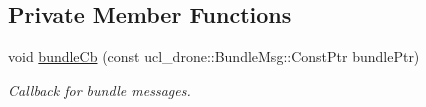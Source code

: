 \subsection*{Private Member Functions}
\begin{DoxyCompactItemize}
\item 
\mbox{\label{classBundleAdjuster_ac252cd426bfdad4e3089d885a2ab6ac2}} 
void \hyperlink{classBundleAdjuster_ac252cd426bfdad4e3089d885a2ab6ac2}{bundle\+Cb} (const ucl\+\_\+drone\+::\+Bundle\+Msg\+::\+Const\+Ptr bundle\+Ptr)
\begin{DoxyCompactList}\small\item\em Callback for bundle messages. \end{DoxyCompactList}\end{DoxyCompactItemize}
